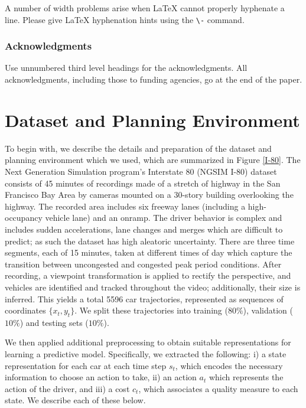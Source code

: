 \documentclass{article} %
\begin{document}
A number of width problems arise when LaTeX cannot properly hyphenate a
line. Please give LaTeX hyphenation hints using the \verb+\-+ command.


\subsubsection*{Acknowledgments}

Use unnumbered third level headings for the acknowledgments. All
acknowledgments, including those to funding agencies, go at the end of the paper.




\appendix

\section{Dataset and Planning Environment}
\label{i80-dataset-prep}

To begin with, we describe the details and preparation of the dataset and planning environment which we used, which are summarized in Figure \ref{I-80}.
The Next Generation Simulation program's Interstate 80 (NGSIM I-80) dataset \citep{NGSIM} consists of 45 minutes of recordings made of a stretch of highway in the San Francisco Bay Area by cameras mounted on a 30-story building overlooking the highway. The recorded area includes six freeway lanes (including a high-occupancy vehicle lane) and an onramp.
The driver behavior is complex and includes sudden accelerations, lane changes and merges which are difficult to predict; as such the dataset has high aleatoric uncertainty.
There are three time segments, each of 15 minutes, taken at different times of day which capture the transition between uncongested and congested peak period conditions.
After recording, a viewpoint transformation is applied to rectify the perspective, and vehicles are identified and tracked throughout the video; additionally, their size is inferred.
This yields a total 5596 car trajectories, represented as sequences of coordinates $\{x_t, y_t\}$. We split these trajectories into training ($80\%$), validation ($10\%$) and testing sets ($10\%$).

We then applied additional preprocessing to obtain suitable representations for learning a predictive model.
Specifically, we extracted the following: i) a state representation for each car at each time step $s_t$, which encodes the necessary information to choose an action to take, ii) an action $a_t$ which represents the action of the driver, and iii) a cost $c_t$, which associates a quality measure to each state. We describe each of these below.
\end{document}
